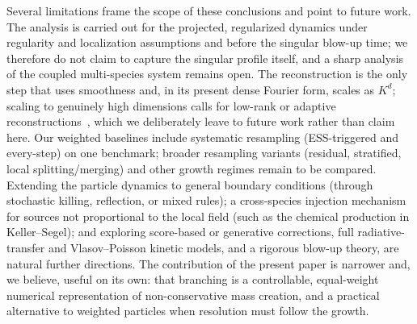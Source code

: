 \documentclass[a4paper,fleqn]{cas-sc}
\theoremstyle{definition}
\theoremstyle{remark}
\begin{document}
Several limitations frame the scope of these conclusions and point to future work. The analysis is carried out
for the projected, regularized dynamics under regularity and localization assumptions and before the singular
blow-up time; we therefore do not claim to capture the singular profile itself, and a sharp analysis of the
coupled multi-species system remains open. The reconstruction is the only step that uses smoothness and, in its
present dense Fourier form, scales as $K^d$; scaling to genuinely high dimensions calls for low-rank or adaptive
reconstructions~\cite{TangYing2025FHT,tang2025solving,Peng_Yang_tensor_arxiv_2024,novikov2021tensor,sheng2025approximation},
which we deliberately leave to future work rather than claim here. Our weighted baselines include systematic
resampling (ESS-triggered and every-step) on one benchmark; broader resampling variants (residual, stratified,
local splitting/merging) and other growth regimes remain to be compared. Extending the particle dynamics to general
boundary conditions (through stochastic killing, reflection, or mixed rules); a cross-species injection mechanism
for sources not proportional to the local field (such as the chemical production in Keller--Segel); and exploring
score-based or generative corrections, full radiative-transfer and Vlasov--Poisson kinetic models, and a rigorous
blow-up theory, are natural further directions. The contribution of the present paper is narrower and, we believe,
useful on its own: that branching is a controllable, equal-weight numerical representation of non-conservative
mass creation, and a practical alternative to weighted particles when resolution must follow the growth.


\end{document}
